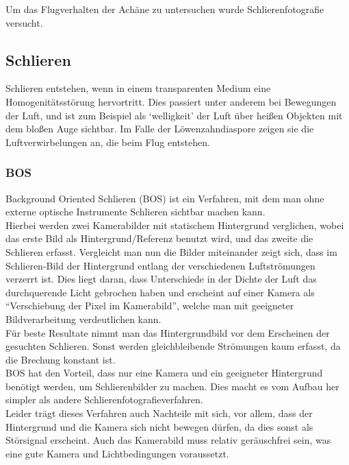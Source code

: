 Um das Flugverhalten der Achäne zu untersuchen wurde Schlierenfotografie versucht.

\subsection{Schlieren}\label{subsec:schlieren}

Schlieren entstehen, wenn in einem transparenten Medium eine Homogenitätsstörung hervortritt.
Dies passiert unter anderem bei Bewegungen der Luft, und ist zum Beispiel als `welligkeit' der Luft über heißen Objekten mit dem bloßen Auge sichtbar.
Im Falle der Löwenzahndiaspore zeigen sie die Luftverwirbelungen an, die beim Flug entstehen.

\subsubsection{BOS}\label{subsubsec:bos}

Background Oriented Schlieren (BOS) ist ein Verfahren,
mit dem man ohne externe optische Instrumente Schlieren sichtbar machen kann.
\smallskip\\
Hierbei werden zwei Kamerabilder mit statischem Hintergrund verglichen,
wobei das erste Bild als Hintergrund/Referenz benutzt wird, und das zweite die Schlieren erfasst.
Vergleicht man nun die Bilder miteinander zeigt sich, dass im Schlieren-Bild der Hintergrund entlang der verschiedenen Luftströmungen verzerrt ist.
Dies liegt daran, dass Unterschiede in der Dichte der Luft das durchquerende Licht gebrochen haben und erscheint auf einer Kamera als \enquote{Verschiebung der Pixel im Kamerabild},
welche man mit geeigneter Bildverarbeitung verdeutlichen kann.
\smallskip\\
Für beste Resultate nimmt man das Hintergrundbild vor dem Erscheinen der gesuchten Schlieren.
Sonst werden gleichbleibende Strömungen kaum erfasst, da die Brechung konstant ist.
\bigskip\\
BOS hat den Vorteil, dass nur eine Kamera und ein geeigneter Hintergrund benötigt werden, um Schlierenbilder zu machen.
Dies macht es vom Aufbau her simpler als andere Schlierenfotografieverfahren.
\smallskip\\
Leider trägt dieses Verfahren auch Nachteile mit sich, vor allem, dass der Hintergrund und die Kamera sich nicht bewegen dürfen,
da dies sonst als Störsignal erscheint.
Auch das Kamerabild muss relativ geräuschfrei sein, was eine gute Kamera und Lichtbedingungen voraussetzt.


